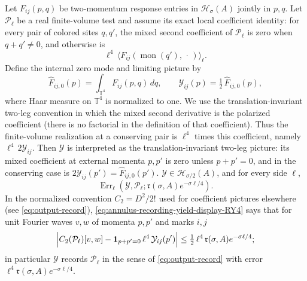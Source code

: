 \begin{lemma}
\label{lem:ex-pole-recording}
Let $F_{ij}(p,q)$ be two-momentum response entries in
$\mathcal H_\sigma(A)$ jointly in $p,q$. Let $\mathcal P_\ell$
be a real finite-volume test and
assume its exact local coefficient identity: for every pair of colored
sites $q,q'$, the mixed second coefficient of $\mathcal P_\ell$ is zero
when $q+q'\ne0$, and otherwise is
\begin{equation}
 \ell^4\,\langle F_{ij}(\operatorname{mon}(q'),\,\cdot\,)\rangle_\ell.
 \label{eq:annulus-recording-yield-display-RY3}
\end{equation}
Define the internal zero mode and limiting picture by
\[
 \widehat F_{ij,0}(p)=\int_{\mathbb T^4}F_{ij}(p,q)\,dq,
 \qquad
 \mathcal Y_{ij}(p)=\tfrac12\,\widehat F_{ij,0}(p),
\]
where Haar measure on $\mathbb T^4$ is normalized to one. We use the
translation-invariant two-leg convention in which the mixed second
derivative is the polarized coefficient (there is no factorial in the
definition of that coefficient). Thus the finite-volume realization at a
conserving pair is $\ell^4$ times this coefficient, namely
$\ell^4\,2\mathcal Y_{ij}$. Then
$\mathcal Y$ is interpreted as the translation-invariant two-leg picture:
its mixed coefficient at external momenta $p,p'$ is zero unless
$p+p'=0$, and in the conserving case is
$2\mathcal Y_{ij}(p')=\widehat F_{ij,0}(p')$.
$\mathcal Y\in\mathcal H_{\sigma/2}(A)$, and for every side $\ell$,
\begin{equation}
 \operatorname{Err}_\ell(\mathcal Y,\mathcal P_\ell;
     \mathfrak r(\sigma,A)e^{-\sigma\ell/4}).
 \label{eq:annulus-recording-yield-display-RY4}
\end{equation}
In the normalized convention $C_2=D^2/2!$ used for coefficient pictures
elsewhere (see \eqref{eq:output-record}), \eqref{eq:annulus-recording-yield-display-RY4} says that for unit
Fourier waves $v,w$ of momenta $p,p'$ and marks $i,j$
\begin{equation}
 \Bigl|C_2(\mathcal P_\ell)[v,w]
   -\mathbf 1_{p+p'=0}\,\ell^4\,\mathcal Y_{ij}(p')\Bigr|
  \leq\tfrac12\,\ell^4\,\mathfrak r(\sigma,A)e^{-\sigma\ell/4};
 \label{eq:annulus-recording-yield-display-RY4-prime}
\end{equation}
in particular $\mathcal Y$ records $\mathcal P_\ell$ in the sense of
\eqref{eq:output-record} with error
$\ell^4\mathfrak r(\sigma,A)e^{-\sigma\ell/4}$.
\end{lemma}
